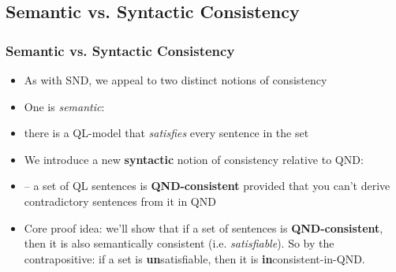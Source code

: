 \fi %

















\subsection{Semantic vs. Syntactic Consistency}

\begin{frame}
\frametitle{Semantic vs. Syntactic Consistency}

\begin{itemize}[<+->]

\item As with SND, we appeal to two distinct notions of consistency

\item One is \emph{semantic}: %

\item[] there is a QL-model that \emph{satisfies} every sentence in the set

\item We introduce a new \textbf{syntactic} notion of consistency relative to QND:

\item[] -- a set of QL sentences is \textbf{QND-consistent} provided that you can't derive contradictory sentences from it in QND

\item Core proof idea: we'll show that if a set of sentences is \textbf{QND-consistent}, then it is also semantically consistent (i.e. \emph{satisfiable}). So by the contrapositive: if a set is \textbf{\textcolor{OGlyallpink}{un}}satisfiable, then it is \textbf{\textcolor{OGlyallpink}{in}}consistent-in-QND. 

\end{itemize}
\end{frame}


